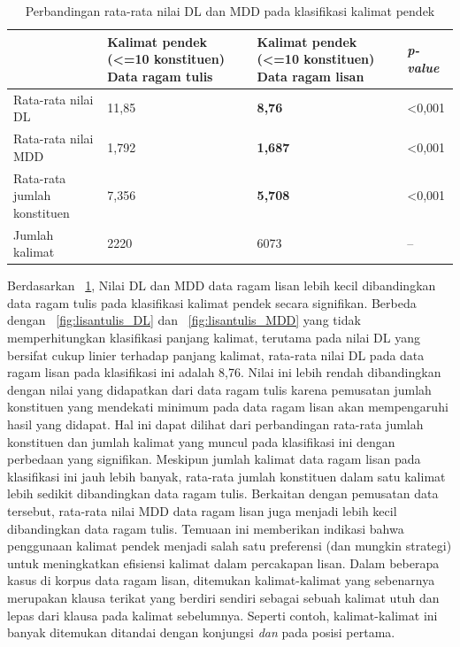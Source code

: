 \begin{table}
\begin{center}
\begin{small}
\caption{Perbandingan rata-rata nilai DL dan MDD pada klasifikasi kalimat pendek }\label{tab:DL_MDD_pendek}
  \begin{tabular}{ | p{3.2cm} | p{3.2cm} | p{3.2cm} | p{2cm} |}
    \hline
 & Kalimat pendek \newline (\textless =10 konstituen) \newline Data ragam tulis & Kalimat pendek \newline (\textless =10 konstituen) \newline Data ragam lisan & \textit{p-value} \\ \hline
 Rata-rata nilai DL & 11,85 & \textbf{8,76} & \textless 0,001 \\ \hline
 Rata-rata nilai MDD & 1,792 & \textbf{1,687} & \textless 0,001 \\ \hline
 Rata-rata jumlah konstituen & 7,356 & \textbf{5,708} & \textless 0,001 \\ \hline
 Jumlah kalimat & 2220 & 6073 & -- \\ \hline
   \end{tabular}
   \end{small}
\end{center}
\end{table}

Berdasarkan \tab~\ref{tab:DL_MDD_pendek}, Nilai DL dan MDD data ragam lisan lebih kecil dibandingkan data ragam tulis pada klasifikasi kalimat pendek secara signifikan. Berbeda dengan \pic~\ref{fig:lisantulis_DL}  dan \pic~\ref{fig:lisantulis_MDD} yang tidak memperhitungkan klasifikasi panjang kalimat, terutama pada nilai DL yang bersifat cukup linier terhadap panjang kalimat, rata-rata nilai DL pada data ragam lisan pada klasifikasi ini adalah 8,76. Nilai ini lebih rendah dibandingkan dengan nilai yang didapatkan dari data ragam tulis karena pemusatan jumlah konstituen yang mendekati minimum pada data ragam lisan akan mempengaruhi hasil yang didapat. Hal ini dapat dilihat dari perbandingan rata-rata jumlah konstituen dan jumlah kalimat yang muncul pada klasifikasi ini dengan perbedaan yang signifikan. Meskipun jumlah kalimat data ragam lisan pada klasifikasi ini jauh lebih banyak, rata-rata jumlah konstituen dalam satu kalimat lebih sedikit dibandingkan data ragam tulis.  Berkaitan dengan pemusatan data tersebut, rata-rata nilai MDD data ragam lisan juga menjadi lebih kecil dibandingkan data ragam tulis. Temuaan ini memberikan indikasi bahwa penggunaan kalimat pendek menjadi salah satu preferensi (dan mungkin strategi)  untuk meningkatkan efisiensi kalimat dalam percakapan lisan. Dalam beberapa kasus di korpus data ragam lisan, ditemukan kalimat-kalimat yang sebenarnya merupakan klausa terikat yang berdiri sendiri sebagai sebuah kalimat utuh dan lepas dari klausa pada kalimat sebelumnya. Seperti contoh, kalimat-kalimat ini banyak ditemukan ditandai dengan konjungsi \textit{dan} pada posisi pertama. 

